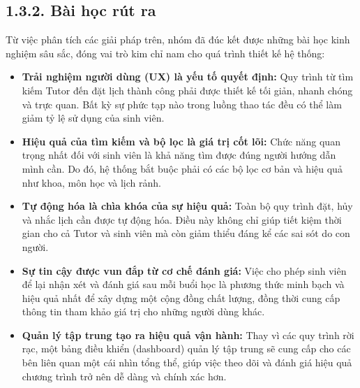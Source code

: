 \subsection*{1.3.2. Bài học rút ra}
Từ việc phân tích các giải pháp trên, nhóm đã đúc kết được những bài học kinh nghiệm sâu sắc, đóng vai trò kim chỉ nam cho quá trình thiết kế hệ thống:
\begin{itemize}
    \item \textbf{Trải nghiệm người dùng (UX) là yếu tố quyết định:} Quy trình từ tìm kiếm Tutor đến đặt lịch thành công phải được thiết kế tối giản, nhanh chóng và trực quan. Bất kỳ sự phức tạp nào trong luồng thao tác đều có thể làm giảm tỷ lệ sử dụng của sinh viên.
    \item \textbf{Hiệu quả của tìm kiếm và bộ lọc là giá trị cốt lõi:}  Chức năng quan trọng nhất đối với sinh viên là khả năng tìm được đúng người hướng dẫn mình cần. Do đó, hệ thống bắt buộc phải có các bộ lọc cơ bản và hiệu quả như khoa, môn học và lịch rảnh.

    \item \textbf{Tự động hóa là chìa khóa của sự hiệu quả:}  Toàn bộ quy trình đặt, hủy và nhắc lịch cần được tự động hóa. Điều này không chỉ giúp tiết kiệm thời gian cho cả Tutor và sinh viên mà còn giảm thiểu đáng kể các sai sót do con người.

    \item \textbf{Sự tin cậy được vun đắp từ cơ chế đánh giá:}  Việc cho phép sinh viên để lại nhận xét và đánh giá sau mỗi buổi học là phương thức minh bạch và hiệu quả nhất để xây dựng một cộng đồng chất lượng, đồng thời cung cấp thông tin tham khảo giá trị cho những người dùng khác.

    \item \textbf{Quản lý tập trung tạo ra hiệu quả vận hành:}  Thay vì các quy trình rời rạc, một bảng điều khiển (dashboard) quản lý tập trung sẽ cung cấp cho các bên liên quan một cái nhìn tổng thể, giúp việc theo dõi và đánh giá hiệu quả chương trình trở nên dễ dàng và chính xác hơn.

\end{itemize}


